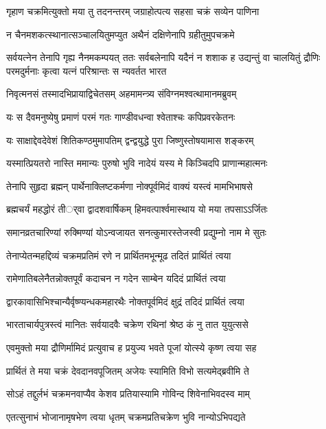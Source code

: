 \twolineshloka
{गृहाण चक्रमित्युक्तो मया तु तदनन्तरम्}
{जग्राहोत्पत्य सहसा चक्रं सव्येन पाणिना}


\twolineshloka
{न चैनमशकत्स्थानात्सञ्चालयितुमप्युत}
{अथैनं दक्षिणेनापि ग्रहीतुमुपचक्रमे}


सर्वयत्नेन तेनापि गृह्य नैनमकम्पयत्
\threelineshloka
{ततः सर्वबलेनापि यदैनं न शशाक ह}
{उद्यन्तुं वा चालयितुं द्रौणिः परमदुर्मनाः}
{कृत्वा यत्नं परिश्रान्तः स न्यवर्तत भारत}


\twolineshloka
{निवृत्मनसं तस्मादभिप्रायाद्विचेतसम्}
{अहमामन्त्र्य संविग्नमश्वत्थामानमब्रुवम्}


\twolineshloka
{यः स दैवमनुष्येषु प्रमाणं परमं गतः}
{गाण्डीवधन्वा श्वेताश्चः कपिप्रवरकेतनः}


\twolineshloka
{यः साक्षाद्देवदेवेशं शितिकण्ठमुमापतिम्}
{द्वन्द्वयुद्धे पुरा जिष्णुस्तोषयामास शङ्करम्}


\twolineshloka
{यस्मात्प्रियतरो नास्ति ममान्यः पुरुषो भुवि}
{नादेयं यस्य मे किञ्चिदपि प्राणान्महात्मनः}


\twolineshloka
{तेनापि सुहृदा ब्रह्मन् पार्थेनाक्लिष्टकर्मणा}
{नोक्पूर्वमिदं वाक्यं यस्त्वं मामभिभाषसे}


\twolineshloka
{ब्रह्मचर्यं महद्धोरं तीर््वा द्वादशवार्षिकम्}
{हिमवत्पार्श्वमास्थाय यो मया तपसाऽऽर्जितः}


\twolineshloka
{समानव्रतचारिण्यां रुक्मिण्यां योऽन्वजायत}
{सनत्कुमारस्तेजस्वी प्रद्युम्नो नाम मे सुतः}


\twolineshloka
{तेनाप्येतन्महद्दिव्यं चक्रमप्रतिमं रणे}
{न प्रार्थितमभून्मूढ तदितं प्रार्थितं त्वया}


\twolineshloka
{रामेणातिबलेनैतन्नोक्तपूर्वं कदाचन}
{न गदेन साम्बेन यदिदं प्रार्थितं त्वया}


\twolineshloka
{द्वारकावासिभिश्चान्यैर्वृष्ण्यन्धकमहारथैः}
{नोक्तपूर्वमिदं क्षुद्रं तदिदं प्रार्थितं त्वया}


\twolineshloka
{भारताचार्यपुत्रस्त्वं मानितः सर्वयादवैः}
{चक्रेण रथिनां श्रेष्ठ कं नु तात युयुत्ससे}


\twolineshloka
{एवमुक्तो मया द्रौणिर्मामिदं प्रत्युवाच ह}
{प्रयुज्य भवते पूजां योत्स्ये कृष्ण त्वया सह}


\twolineshloka
{प्रार्थितं ते मया चक्रं देवदानवपूजितम्}
{अजेयः स्यामिति विभो सत्यमेद्ब्रवीमि ते}


\twolineshloka
{सोऽहं तद्दुर्लभं चक्रमनवाप्यैव केशव}
{प्रतियास्यामि गोविन्द शिवेनाभिवदस्व माम्}


\twolineshloka
{एतत्सुनाभं भोजानामृषभेण त्वया धृतम्}
{चक्रमप्रतिचक्रेण भुवि नान्योऽभिपद्यते}


